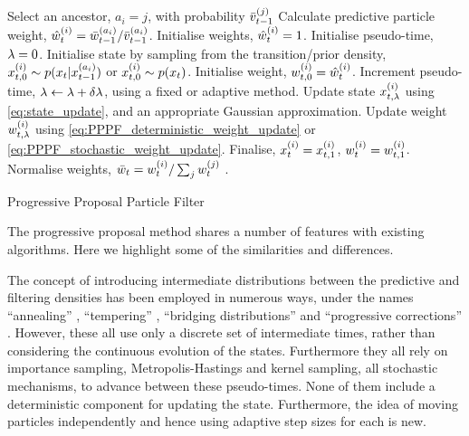 \documentclass{article}
\begin{document}
\begin{algorithm} \label{alg:general_PPPF}
\begin{algorithmic}[1]
        \STATE Select an ancestor, $a_i=j$, with probability $\bar{v}_{t-1}^{(j)}$
        \STATE Calculate predictive particle weight, $\hat{w}_{t}^{(i)} = \bar{w}_{t-1}^{(a_i)} / \bar{v}_{t-1}^{(a_i)}$.
      \ELSE
        \STATE Initialise weights, $\hat{w}_{t}^{(i)} = 1$.
      \ENDIF
      \STATE Initialise pseudo-time, $\lambda=0$.
      \STATE Initialise state by sampling from the transition/prior density, $x_{t,0}^{(i)} \sim p(x_{t} | x_{t-1}^{(a_{i})})$ or $x_{t,0}^{(i)} \sim p(x_{t})$.
      \STATE Initialise weight, $w_{t,0}^{(i)} = \hat{w}_{t}^{(i)}$.
        \STATE Increment pseudo-time, $\lambda \leftarrow \lambda+\delta\lambda$, using a fixed or adaptive method.
        \STATE Update state $x_{t,\lambda}^{(i)}$ using \eqref{eq:state_update}, and an appropriate Gaussian approximation.
        \STATE Update weight $w_{t,\lambda}^{(i)}$ using \eqref{eq:PPPF_deterministic_weight_update} or \eqref{eq:PPPF_stochastic_weight_update}.
      \ENDWHILE
      \STATE Finalise, $x_{t}^{(i)} = x_{t,1}^{(i)}$, $w_{t}^{(i)} = w_{t,1}^{(i)}$.
    \ENDFOR
    \STATE Normalise weights, $\bar{w}_{t} = w_{t}^{(i)} / \sum_j w_{t}^{(j)}$ .
  \ENDFOR
\end{algorithmic}
\caption{Progressive Proposal Particle Filter}
\end{algorithm}

The progressive proposal method shares a number of features with existing algorithms. Here we highlight some of the similarities and differences.

The concept of introducing intermediate distributions between the predictive and filtering densities has been employed in numerous ways, under the names ``annealing'' \citep{Neal2001,Deutscher2000,Gall2007}, ``tempering'' \citep{DelMoral2006}, ``bridging distributions'' \citep{Godsill2001b} and ``progressive corrections'' \citep{Oudjane2000}. However, these all use only a discrete set of intermediate times, rather than considering the continuous evolution of the states. Furthermore they all rely on importance sampling, Metropolis-Hastings and kernel sampling, all stochastic mechanisms, to advance between these pseudo-times. None of them include a deterministic component for updating the state. Furthermore, the idea of moving particles independently and hence using adaptive step sizes for each is new.
\end{document}
